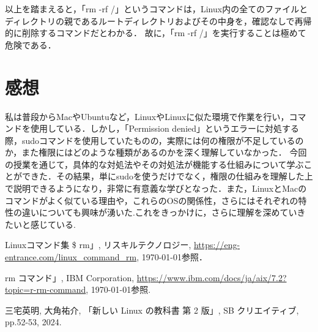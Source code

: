 \documentclass{jreport}  %
\begin{document}
以上を踏まえると，「rm -rf /」というコマンドは，Linux内の全てのファイルとディレクトリの親であるルートディレクトリおよびその中身を，確認なしで再帰的に削除するコマンドだとわかる．
故に，「rm -rf /」を実行することは極めて危険である．
\section{感想}
私は普段からMacやUbuntuなど，LinuxやLinuxに似た環境で作業を行い，コマンドを使用している．しかし，「Permission denied」というエラーに対処する際，sudoコマンドを使用していたものの，実際には何の権限が不足しているのか，また権限にはどのような種類があるのかを深く理解していなかった．
今回の授業を通じて，具体的な対処法やその対処法が機能する仕組みについて学ぶことができた．その結果，単にsudoを使うだけでなく，権限の仕組みを理解した上で説明できるようになり，非常に有意義な学びとなった．また，LinuxとMacのコマンドがよく似ている理由や，これらのOSの関係性，さらにはそれぞれの特性の違いについても興味が湧いた.これをきっかけに，さらに理解を深めていきたいと感じている.

\begin{thebibliography}{9}
    \item Linuxコマンド集 \$ rm」, リスキルテクノロジー, \url{https://eng-entrance.com/linux_command_rm}, \today 参照．
    \item rm コマンド」, IBM Corporation, \url{https://www.ibm.com/docs/ja/aix/7.2?topic=r-rm-command}, \today 参照.
    \item 三宅英明, 大角祐介, 「新しい Linux の教科書 第 2 版」, SB クリエイティブ, pp.52-53, 2024.
\end{thebibliography}
\end{document}

